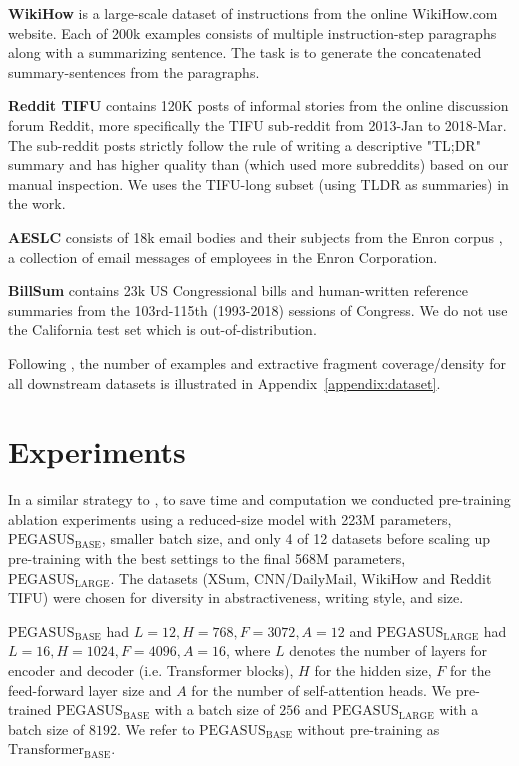 \documentclass{article}
\newcommand\todo[1]{\textcolor{red}{TODO(#1)}}
\newcommand\pegasusbase{$\text{PEGASUS}_{\text{BASE}}$\xspace}
\newcommand\transformerbase{$\text{Transformer}_{\text{BASE}}$\xspace}
\newcommand\pegasuslarge{$\text{PEGASUS}_{\text{LARGE}}$\xspace}
\newcommand\largemodelsize{568M\xspace}
\newcommand\basemodelsize{223M\xspace}
\begin{document}
\textbf{WikiHow} \citep{koupaee2018wikihow} is a large-scale dataset of instructions from the online WikiHow.com website.
Each of 200k examples consists of multiple instruction-step paragraphs along with a summarizing sentence. The task is to generate the concatenated summary-sentences from the paragraphs.

\textbf{Reddit TIFU} \citep{kim-etal-2019-reddittifu} contains  120K posts of informal stories from the online discussion forum Reddit, more specifically the TIFU sub-reddit from 2013-Jan to 2018-Mar. The sub-reddit posts strictly follow the rule of writing a descriptive "TL;DR" summary and has higher quality than \citep{volske-etal-2017-tl} (which used more subreddits) based on our manual inspection. We uses the TIFU-long subset (using TLDR as summaries) in the work.

\textbf{AESLC} \citep{zhang-tetreault-2019-aeslc} consists of 18k email bodies and their subjects from the Enron corpus \citep{Klimt:2004:ECN:3108498.3108522}, a collection of email messages of employees in the Enron Corporation.

\textbf{BillSum} \citep{kornilova-eidelman-2019-billsum} contains 23k US Congressional bills and human-written reference summaries from the 103rd-115th (1993-2018) sessions of Congress. We do not use the California test set
which is out-of-distribution.

Following \citeauthor{Grusky2018newsroom}, 
the number of examples and extractive fragment coverage/density for all downstream datasets is illustrated
in Appendix~\ref{appendix:dataset}. 

\section{Experiments}
\label{sec:experiments}
In a similar strategy to \citet{raffel2019exploring}, to save time and computation we conducted pre-training ablation experiments using a reduced-size model with \basemodelsize parameters, \textbf{\pegasusbase},  smaller batch size, and only 4 of 12 datasets
before scaling up pre-training with the best settings to the final \largemodelsize parameters, \textbf{\pegasuslarge}. The datasets (XSum, CNN/DailyMail, WikiHow and Reddit TIFU) were chosen for diversity in abstractiveness, writing style, and size.



\pegasusbase had $L=12, H=768, F=3072, A=12$ and \pegasuslarge had $L=16, H=1024, F=4096, A=16$, where $L$ denotes the number of layers for encoder and decoder (i.e. Transformer blocks), $H$ for the hidden size, $F$ for the feed-forward layer size and $A$ for the number of self-attention heads. 
We pre-trained \pegasusbase with a batch size of $256$ and \pegasuslarge with a batch size of $8192$. 
We refer to \pegasusbase without pre-training as \textbf{\transformerbase}.
\end{document}
